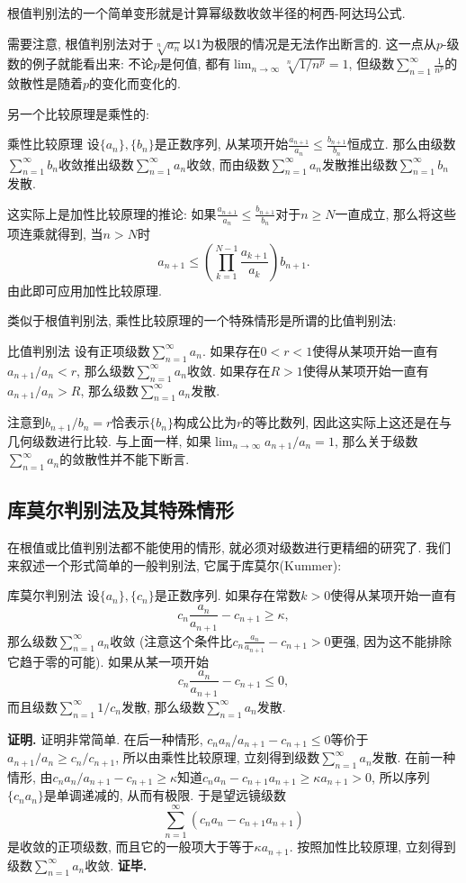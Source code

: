 根值判别法的一个简单变形就是计算幂级数收敛半径的柯西-阿达玛公式.

需要注意, 根值判别法对于$\sqrt[n]{a_n}$以1为极限的情况是无法作出断言的. 这一点从$p$-级数的例子就能看出来: 不论$p$是何值, 都有$\lim_{n\to\infty}\sqrt[n]{1/n^p}=1$, 但级数$\sum_{n=1}^\infty\frac{1}{n^p}$的敛散性是随着$p$的变化而变化的.

另一个比较原理是乘性的:
\begin{theorem}{乘性比较原理}
设$\{a_n\},\{b_n\}$是正数序列, 从某项开始$\frac{a_{n+1}}{a_n}\leq \frac{b_{n+1}}{b_n}$恒成立. 那么由级数$\sum_{n=1}^\infty b_n$收敛推出级数$\sum_{n=1}^\infty a_n$收敛, 而由级数$\sum_{n=1}^\infty a_n$发散推出级数$\sum_{n=1}^\infty b_n$发散.
\end{theorem}
这实际上是加性比较原理的推论: 如果$\frac{a_{n+1}}{a_n}\leq \frac{b_{n+1}}{b_n}$对于$n\geq N$一直成立, 那么将这些项连乘就得到, 当$n>N$时
$$
a_{n+1}\leq \left(\prod_{k=1}^{N-1}\frac{a_{k+1}}{a_k}\right)b_{n+1}.
$$
由此即可应用加性比较原理.

类似于根值判别法, 乘性比较原理的一个特殊情形是所谓的比值判别法:
\begin{theorem}{比值判别法}
设有正项级数$\sum_{n=1}^\infty a_n$. 如果存在$0<r<1$使得从某项开始一直有$a_{n+1}/a_n<r$, 那么级数$\sum_{n=1}^\infty a_n$收敛. 如果存在$R>1$使得从某项开始一直有$a_{n+1}/{a_n}>R$, 那么级数$\sum_{n=1}^\infty a_n$发散.
\end{theorem}
注意到$b_{n+1}/b_n=r$恰表示$\{b_n\}$构成公比为$r$的等比数列, 因此这实际上这还是在与几何级数进行比较. 与上面一样, 如果$\lim_{n\to\infty}a_{n+1}/a_n=1$, 那么关于级数$\sum_{n=1}^\infty a_n$的敛散性并不能下断言.

\subsection{库莫尔判别法及其特殊情形}
在根值或比值判别法都不能使用的情形, 就必须对级数进行更精细的研究了. 我们来叙述一个形式简单的一般判别法, 它属于库莫尔(Kummer):

\begin{theorem}{库莫尔判别法}
设$\{a_n\},\{c_n\}$是正数序列. 如果存在常数$k>0$使得从某项开始一直有
$$
c_n\frac{a_n}{a_{n+1}}-c_{n+1}\geq \kappa,
$$
那么级数$\sum_{n=1}^\infty a_n$收敛 (注意这个条件比$c_n\frac{a_n}{a_{n+1}}-c_{n+1}>0$更强, 因为这不能排除它趋于零的可能). 如果从某一项开始
$$
c_n\frac{a_n}{a_{n+1}}-c_{n+1} \leq0,
$$
而且级数$\sum_{n=1}^\infty 1/c_n$发散, 那么级数$\sum_{n=1}^\infty a_n$发散.
\end{theorem}
\textbf{证明.} 证明非常简单. 在后一种情形, $c_n{a_n}/{a_{n+1}}-c_{n+1} \leq0$等价于$a_{n+1}/a_n\geq c_{n}/c_{n+1}$, 所以由乘性比较原理, 立刻得到级数$\sum_{n=1}^\infty a_n$发散. 在前一种情形, 由$c_n{a_n}/{a_{n+1}}-c_{n+1}\geq \kappa$知道$c_na_n-c_{n+1}a_{n+1}\geq \kappa a_{n+1}>0$, 所以序列$\{c_na_n\}$是单调递减的, 从而有极限. 于是望远镜级数
$$
\sum_{n=1}^\infty (c_na_n-c_{n+1}a_{n+1})
$$
是收敛的正项级数, 而且它的一般项大于等于$\kappa a_{n+1}$. 按照加性比较原理, 立刻得到级数$\sum_{n=1}^\infty a_n$收敛. \textbf{证毕.}